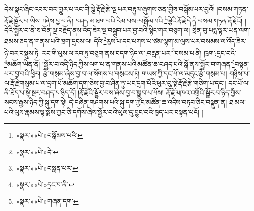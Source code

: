 དེས་སྣང་ཞིང་འབར་བར་གྱུར་པ་རང་གི་ལྕེ་རྡོ་རྗེ་རྩེ་ལྔ་པར་བརྟུལ་ཞུགས་ཅན་གྱིས་བསྒོམ་པར་བྱའོ། །བསམ་གཏན་རྡོ་རྗེ་སྦྱོར་བ་ཡིས། །ཞེས་བྱ་བ་ནི། བཤད་མ་ཐག་པའི་རིམ་པས་:བསྒོམ་པའི་\footnote{«སྣར་»«པེ་»བསྒོམས་པའི་}ལྕེའི་རྡོ་རྗེ་དེ་ནི་བསམ་གཏན་རྡོ་རྗེའོ། །དེའི་སྦྱོར་བ་ནི་ས་བོན་ལྔ་བརྗོད་ནས་འོད་ཟེར་ལྔ་བསྒྲུབ་པར་བྱ་བའི་སྙིང་གར་བཅུག་ལ། སྲིན་བུ་པདྨ་ལྟར་ཡན་ལག་ཐམས་ཅད་ན་གནས་པའི་ཁྲག་དྲངས་ལ། དེའི་\footnote{«སྣར་»«པེ་»དེ་}རུས་པ་དང་པགས་པ་ཙམ་ལྷག་མ་ལུས་པར་བསམས་ལ་འོད་ཟེར་ཉེ་བར་བསྡུས་ཏེ། རང་གི་ལུས་ལ་རབ་ཏུ་བཅུག་ནས་བདག་ཉིད་ལ་:བརླན་པར་\footnote{«སྣར་»«པེ་»བསླན་པར་}བསམ་པ་ནི། ཁྲག་:དྲང་བའི་\footnote{«སྣར་»«པེ་»དྲང་བ་ནི་}མཆོག་ཡིན་ནོ། །སྦྱོར་བ་འདི་ཉིད་ཀྱིས་ལག་པ་ན་གནས་པའི་མཚོན་ཆ་བཤད་པའི་སྒོ་ནས་སྦྱོར་བ་གཞན་\footnote{«སྣར་»«པེ་»གཞན་དག་}བསྟན་པར་བྱ་བའི་ཕྱིར། རྩེ་གསུམ་ཞེས་བྱ་བ་ལ་སོགས་པ་གསུངས་ཏེ། གཡས་ཀྱི་དང་པོ་ལ་མདུང་རྩེ་གསུམ་པ། གཉིས་པ་ལ་རྡོ་རྗེ་གསུམ་པ་ལ་དྲག་པོ་མཆོག་དག་ཅེས་བྱ་བ་ཤིན་ཏུ་ཡང་དྲག་པོའི་ཕུར་བུ་སྟེ་རྡོ་རྗེ་རྩེ་གཅིག་པ་དང་། དང་པོ་ལ་ནི་ཐོད་པ་སྟེ་སྔར་བཤད་པ་ཉིད་དོ། །རྡོ་རྗེའི་སྦྱོར་བས་ཞེས་བྱ་བ་སྒྲུབ་པ་པོས། རྡོ་རྗེ་མཁའ་འགྲོའི་སྦྱོར་བ་ཉིད་ཀྱིས་སངས་རྒྱས་ཉིད་ཀྱི་སྐུ་དག་སྟེ། དེ་བཞིན་གཤེགས་པའི་སྐུ་དག་ཀྱང་མཚོན་ཆ་འདིས་བཏབ་ཅིང་བསྣུན་ན། ཐ་མལ་པའི་ལུས་རྣམས་ལྟ་སྨོས་ཀྱང་ཅི་དགོས་ཞེས་སྦྱོར་བའི་ཕུལ་དུ་བྱུང་བའི་ཁྱད་པར་བསྟན་པའོ། །
